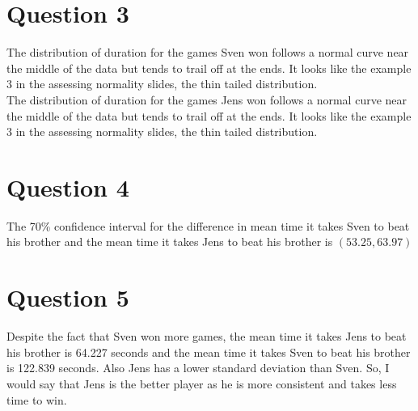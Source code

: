 \documentclass{article}
\begin{document}
\section*{Question 3}
The distribution of duration for the games Sven won follows a normal curve near the middle of the data but tends to trail off at the ends. It looks like the example 3 in the assessing normality slides, the thin tailed distribution.\\
The distribution of duration for the games Jens won follows a normal curve near the middle of the data but tends to trail off at the ends.  It looks like the example 3 in the assessing normality slides, the thin tailed distribution.\\

\section*{Question 4}
The 70\% confidence interval for the difference in mean time it takes Sven to beat his brother and the mean time it takes Jens to beat his brother is $(53.25, 63.97)$

\section*{Question 5}
Despite the fact that Sven won more games, the mean time it takes Jens to beat his brother is 64.227 seconds and the mean time it takes Sven to beat his brother is 122.839 seconds. Also Jens has a lower standard deviation than Sven. So, I would say that Jens is the better player as he is more consistent and takes less time to win.
\end{document}

